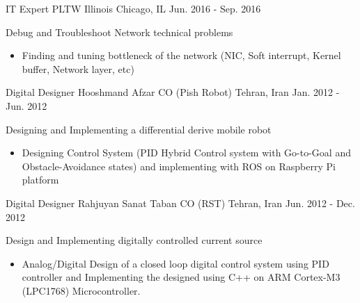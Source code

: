 

\begin{cventries}

  \cventry
    {IT Expert} %
    {PLTW Illinois} %
    {Chicago, IL} %
    {Jun. 2016 - Sep. 2016} %
    {
      \begin{cvitems} %
        \item Debug and Troubleshoot Network technical problems
        \begin{itemize}
        		\item Finding and tuning bottleneck of the network (NIC, Soft interrupt, Kernel buffer, Network layer, etc)
        \end{itemize}
      \end{cvitems}
    }
    
  \cventry
    {Digital Designer} %
    {Hooshmand Afzar CO (Pish Robot)} %
    {Tehran, Iran} %
    {Jan. 2012 - Jun. 2012} %
    {
      \begin{cvitems} %
        \item Designing and Implementing a differential derive mobile robot
        \begin{itemize}
        		\item Designing Control System (PID Hybrid Control system with Go-to-Goal and Obstacle-Avoidance states) and implementing with ROS on Raspberry Pi platform
        \end{itemize}
      \end{cvitems}
    }    
    
    
    
  \cventry
    {Digital Designer} %
    {Rahjuyan Sanat Taban CO (RST)} %
    {Tehran, Iran} %
    {Jun. 2012 - Dec. 2012} %
    {
      \begin{cvitems} %
        \item Design and Implementing digitally controlled current source
        \begin{itemize}
        		\item Analog/Digital Design of a closed loop digital control system using PID controller and Implementing the designed using C++ on ARM Cortex-M3 (LPC1768) Microcontroller. 
        \end{itemize}
      \end{cvitems}
    }




\end{cventries}
